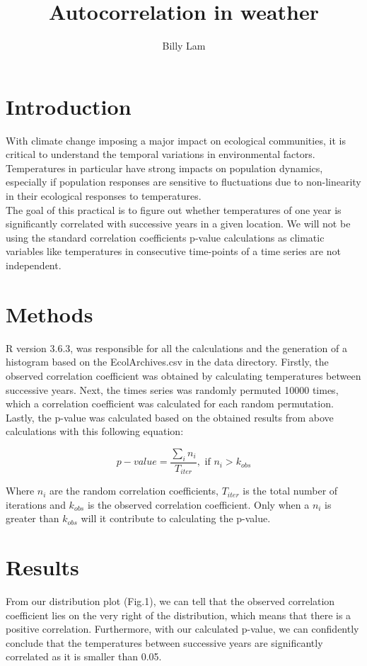 \documentclass[12pt]{article}
\title{Autocorrelation in weather}
\author{Billy Lam}
\date{}
\begin{document}
  \maketitle

  
  \section{Introduction}
    \qquad With climate change imposing a major impact on ecological communities, it is critical to understand the temporal variations in environmental factors. Temperatures in particular have strong impacts on population dynamics, especially if population responses are sensitive to fluctuations due to non-linearity in their ecological responses to temperatures.\cite{di2018increased} \\
    
    The goal of this practical is to figure out whether temperatures of one year is significantly correlated with successive years in a given location. We will not be using the standard correlation coefficients p-value calculations as climatic variables like temperatures in consecutive time-points of a time series are not independent.
    
  \section{Methods}
  \qquad R version 3.6.3, was responsible for all the calculations and the generation of a histogram based on the EcolArchives.csv in the data directory. Firstly, the observed correlation coefficient was obtained by calculating temperatures between successive years.
  Next, the times series was randomly permuted 10000 times, which a correlation coefficient was calculated for each random permutation. Lastly, the p-value was calculated based on the obtained results from above calculations with this following equation:
  
  
  \begin{equation}
          p-value = \frac{\sum_i n_i}{T_{iter}}, \text{ if } n_i > k_{obs}
  \end{equation}

  Where $n_i$ are the random correlation coefficients, $T_{iter}$ is the total number of iterations and $k_{obs}$ is the observed correlation coefficient. Only when a $n_i$ is greater than $k_{obs}$ will it contribute to calculating the p-value.
  
  \section{Results}
   From our distribution plot (Fig.1), we can tell that the observed correlation coefficient lies on the very right of the distribution, which means that there is a positive correlation. Furthermore, with our calculated p-value, we can confidently conclude that the temperatures between successive years are significantly correlated as it is smaller than 0.05.
  
\end{document}
